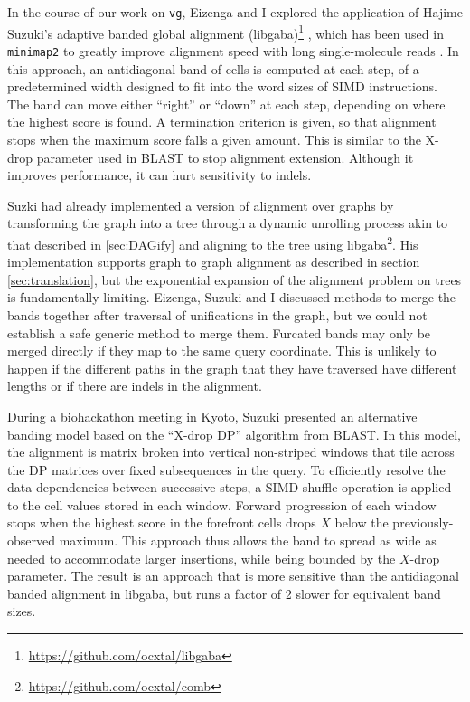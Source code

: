 In the course of our work on {\tt vg}, Eizenga and I explored the application of Hajime Suzuki's adaptive banded global alignment (libgaba)\footnote{\url{https://github.com/ocxtal/libgaba}} \cite{suzuki2017acceleration}, which has been used in {\tt minimap2} to greatly improve alignment speed with long single-molecule reads \cite{li2018minimap2}.
In this approach, an antidiagonal band of cells is computed at each step, of a predetermined width designed to fit into the word sizes of SIMD instructions.
The band can move either ``right'' or ``down'' at each step, depending on where the highest score is found.
A termination criterion is given, so that alignment stops when the maximum score falls a given amount.
This is similar to the X-drop parameter used in BLAST to stop alignment extension.
Although it improves performance, it can hurt sensitivity to indels.

Suzki had already implemented a version of alignment over graphs by transforming the graph into a tree through a dynamic unrolling process akin to that described in \ref{sec:DAGify} and aligning to the tree using libgaba\footnote{\url{https://github.com/ocxtal/comb}}.
His implementation supports graph to graph alignment as described in section \ref{sec:translation}, but the exponential expansion of the alignment problem on trees is fundamentally limiting.
Eizenga, Suzuki and I discussed methods to merge the bands together after traversal of unifications in the graph, but we could not establish a safe generic method to merge them.
Furcated bands may only be merged directly if they map to the same query coordinate.
This is unlikely to happen if the different paths in the graph that they have traversed have different lengths or if there are indels in the alignment.

During a biohackathon meeting in Kyoto, Suzuki presented an alternative banding model based on the ``X-drop DP'' algorithm from BLAST.
In this model, the alignment is matrix broken into vertical non-striped windows that tile across the DP matrices over fixed subsequences in the query.
To efficiently resolve the data dependencies between successive steps, a SIMD shuffle operation is applied to the cell values stored in each window.
Forward progression of each window stops when the highest score in the forefront cells drops $X$ below the previously-observed maximum.
This approach thus allows the band to spread as wide as needed to accommodate larger insertions, while being bounded by the $X$-drop parameter.
The result is an approach that is more sensitive than the antidiagonal banded alignment in libgaba, but runs a factor of 2 slower for equivalent band sizes.

